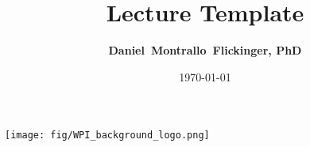 \documentclass[aspectratio=169]{beamer}
\title[\scalebox{2}{\insertlogo}]{Lecture Template}
\author[]{\textbf{Daniel~Montrallo~Flickinger, PhD}}
\institute[]%
{\texttt{[image: fig/WPI\_Inst\_Prim\_FulClr.png]}
}
\date{\today}
\begin{document}
\begin{frame}[label=ROOT]
  \titlepage
\end{frame}




\begin{frame}[label=finalframe]
 

\begin{center}
\texttt{[image: fig/WPI\_background\_logo.png]}
\end{center}

\end{frame}

 
 
\end{document}
